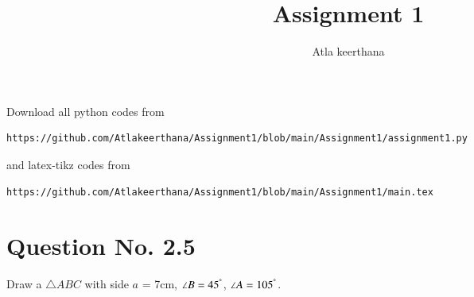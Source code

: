 \documentclass[journal,12pt,twocolumn]{IEEEtran}
\begin{document}
     \def\rightbox#1{\makebox[0in][r]{#1}}
     \def\centbox#1{\makebox[0in]{#1}}
     \def\topbox#1{\raisebox{-\baselineskip}[0in][0in]{#1}}
     \def\midbox#1{\raisebox{-0.5\baselineskip}[0in][0in]{#1}}
\vspace{3cm}
\title{Assignment 1}
\author{Atla keerthana}
\maketitle
\newpage
\bigskip
\renewcommand{\thefigure}{\theenumi}
\renewcommand{\thetable}{\theenumi}
Download all python codes from 
\begin{lstlisting}
https://github.com/Atlakeerthana/Assignment1/blob/main/Assignment1/assignment1.py
\end{lstlisting}
%
and latex-tikz codes from 
%
\begin{lstlisting}
https://github.com/Atlakeerthana/Assignment1/blob/main/Assignment1/main.tex
\end{lstlisting}
\section{Question No. 2.5}
Draw a $\triangle ABC$ with side $a$ = 7cm, $\angle B = 45^{\degree}$, $\angle A = 105^{\degree}$.
\end{document}
